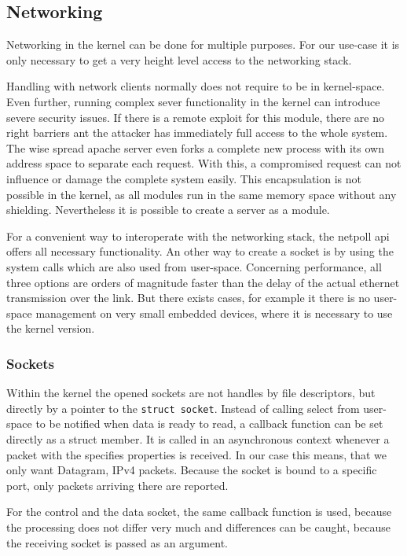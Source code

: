 \documentclass[paper=a4,fontsize=11pt,twocolumn,pagesize,bibtotoc]{scrartcl}
\begin{document}
	\subsection{Networking}
	
	Networking in the kernel can be done for multiple purposes. For our use-case it is only necessary to get a very height level access to the networking stack. 
	
	Handling with network clients normally does not require to be in kernel-space. Even further, running complex sever functionality in the kernel can introduce severe security issues. If there is a remote exploit for this module, there are no right barriers ant the attacker has immediately full access to the whole system. The wise spread apache server even forks a complete new process with its own address space to separate each request. With this, a compromised request can not influence or damage the complete system easily.
	This encapsulation is not possible in the kernel, as all modules run in the same memory space without any shielding. Nevertheless it is possible to create a server as a module.
	
	For a convenient way to interoperate with the networking stack, the netpoll api offers all necessary functionality. An other way to create a socket is by using the system calls which are also used from user-space. Concerning performance, all three options are orders of magnitude faster than the delay of the actual ethernet transmission over the link. But there exists cases, for example it there is no user-space management on very small embedded devices, where it is necessary to use the kernel version.
	
	\subsubsection{Sockets}
	
	Within the kernel the opened sockets are not handles by file descriptors, but directly by a pointer to the \texttt{struct socket}. Instead of calling select from user-space to be notified when data is ready to read, a callback function can be set directly as a struct member. It is called in an asynchronous context whenever a packet with the specifies properties is received. In our case this means, that we only want Datagram, IPv4 packets. Because the socket is bound to a specific port, only packets arriving there are reported.
	
	For the control and the data socket, the same callback function is used, because the processing does not differ very much and differences can be caught, because the receiving socket is passed as an argument.
	
\end{document}
